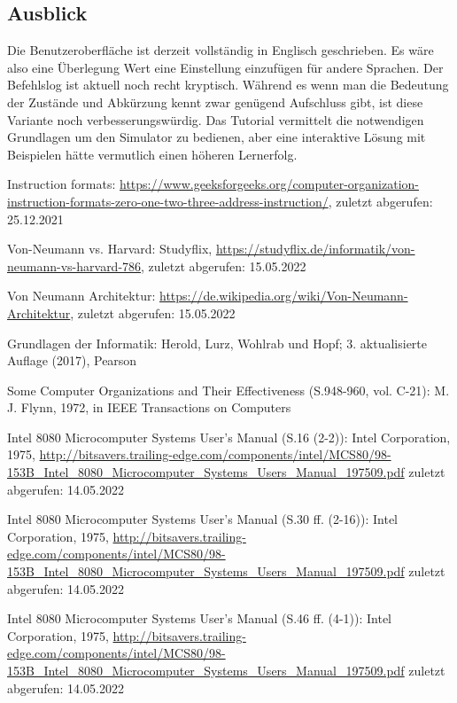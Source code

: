 \documentclass[12pt]{article}
\begin{document}
\subsection{Ausblick}
Die Benutzeroberfläche ist derzeit vollständig in Englisch geschrieben. Es wäre also eine Überlegung Wert eine Einstellung einzufügen für andere Sprachen. Der Befehlslog ist aktuell noch recht kryptisch. Während es wenn man die Bedeutung der Zustände und Abkürzung kennt zwar genügend Aufschluss gibt, ist diese Variante noch verbesserungswürdig. Das Tutorial vermittelt die notwendigen Grundlagen um den Simulator zu bedienen, aber eine interaktive Lösung mit Beispielen hätte vermutlich einen höheren Lernerfolg.

\newpage


\begin{thebibliography}{9}

Instruction formats: \url{https://www.geeksforgeeks.org/computer-organization-instruction-formats-zero-one-two-three-address-instruction/}, zuletzt abgerufen: 25.12.2021

Von-Neumann vs. Harvard: Studyflix,	\url{https://studyflix.de/informatik/von-neumann-vs-harvard-786}, zuletzt abgerufen: 15.05.2022

Von Neumann Architektur: \url{https://de.wikipedia.org/wiki/Von-Neumann-Architektur}, zuletzt abgerufen: 15.05.2022

Grundlagen der Informatik: Herold, Lurz, Wohlrab und Hopf; 3. aktualisierte Auflage (2017), Pearson

Some Computer Organizations and Their Effectiveness (S.948-960, vol. C-21): M. J. Flynn, 1972, in IEEE Transactions on Computers

Intel 8080 Microcomputer Systems User's Manual (S.16 (2-2)): Intel Corporation, 1975, \url{http://bitsavers.trailing-edge.com/components/intel/MCS80/98-153B_Intel_8080_Microcomputer_Systems_Users_Manual_197509.pdf} zuletzt abgerufen: 14.05.2022

Intel 8080 Microcomputer Systems User's Manual (S.30 ff. (2-16)): Intel Corporation, 1975, \url{http://bitsavers.trailing-edge.com/components/intel/MCS80/98-153B_Intel_8080_Microcomputer_Systems_Users_Manual_197509.pdf} zuletzt abgerufen: 14.05.2022

Intel 8080 Microcomputer Systems User's Manual (S.46 ff. (4-1)): Intel Corporation, 1975, \url{http://bitsavers.trailing-edge.com/components/intel/MCS80/98-153B_Intel_8080_Microcomputer_Systems_Users_Manual_197509.pdf} zuletzt abgerufen: 14.05.2022


\end{thebibliography}
\end{document}
